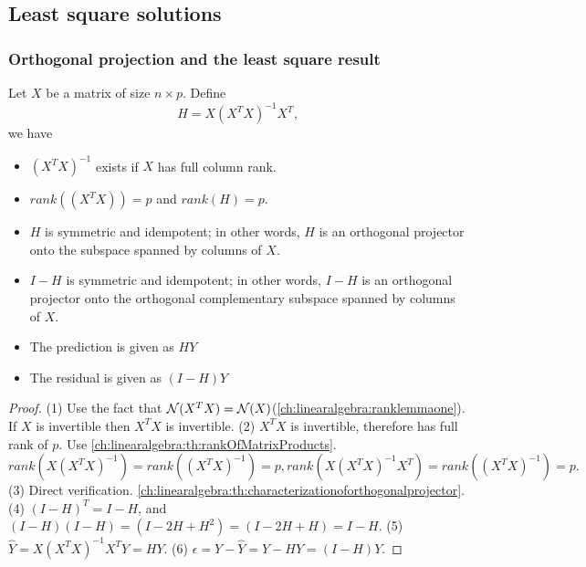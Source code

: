 \begin{refsection}
\subsection{Least square solutions}
\subsubsection{Orthogonal projection and the least square result}
\begin{lemma}\label{ch:theory-of-statistics:th:propertylinearregression}
	Let $X$ be a matrix of size $n\times p$. 
	Define $$H = X(X^TX)^{-1}X^T,$$ we have
	\begin{itemize}
		\item $(X^TX)^{-1}$ exists if $X$ has full column rank.
		\item $rank((X^TX)) = p$ and $rank(H) = p$.
		\item $H$ is symmetric and idempotent; in other words, $H$ is an orthogonal projector onto the subspace spanned by columns of $X$.
		\item $I-H$ is symmetric and idempotent; in other words, $I-H$ is an orthogonal projector onto the orthogonal complementary subspace spanned by columns of $X$.
		\item The prediction is given as $HY$
		\item The residual is given as $(I-H)Y$
	\end{itemize}
\end{lemma}
\begin{proof}
	(1) Use the fact that $\mathcal{N}(X^TX) = \mathcal{N}(X)$(\autoref{ch:linearalgebra:ranklemmaone}). If $X$ is invertible then $X^TX$ is invertible.
	(2) $X^TX$ is invertible, therefore has full rank of $p$.  Use \autoref{ch:linearalgebra:th:rankOfMatrixProducts}. $$rank(X(X^TX)^{-1}) = rank((X^TX)^{-1}) = p, rank(X(X^TX)^{-1}X^T) = rank((X^TX)^{-1}) = p.$$
	(3) Direct verification. \autoref{ch:linearalgebra:th:characterizationoforthogonalprojector}.
	(4) $(I-H)^T = I - H$, and $(I-H)(I-H) = (I - 2H + H^2) = (I - 2H + H) = I - H$.
	(5) $\hat{Y} = X(X^TX)^{-1}X^TY = HY$.
	(6) $\epsilon = Y - \hat{Y} = Y - HY = (I-H)Y$.
\end{proof}




\end{refsection}
